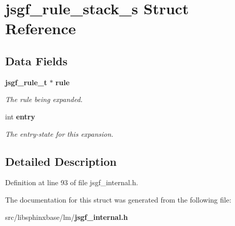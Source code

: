 \section{jsgf\+\_\+rule\+\_\+stack\+\_\+s Struct Reference}
\label{structjsgf__rule__stack__s}
\subsection*{Data Fields}
\begin{DoxyCompactItemize}
\item 
{\bf jsgf\+\_\+rule\+\_\+t} $\ast$ {\bf rule}\label{structjsgf__rule__stack__s_a5fd5facd2b790c949ef2efa80b07148a}

\begin{DoxyCompactList}\small\item\em The rule being expanded. \end{DoxyCompactList}\item 
int {\bf entry}\label{structjsgf__rule__stack__s_a56107dc6cc50d45a5c1811785e8169b7}

\begin{DoxyCompactList}\small\item\em The entry-\/state for this expansion. \end{DoxyCompactList}\end{DoxyCompactItemize}


\subsection{Detailed Description}


Definition at line 93 of file jsgf\+\_\+internal.\+h.



The documentation for this struct was generated from the following file\+:\begin{DoxyCompactItemize}
\item 
src/libsphinxbase/lm/{\bf jsgf\+\_\+internal.\+h}\end{DoxyCompactItemize}
